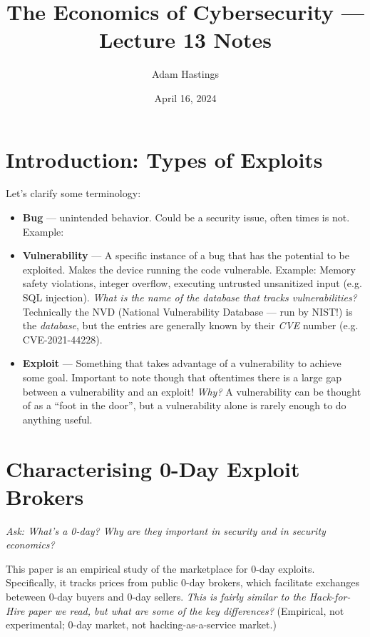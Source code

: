 \documentclass[11pt]{article}
\title{The Economics of Cybersecurity --- Lecture 13 Notes}
\date{April 16, 2024}
\author{Adam Hastings}
\begin{document}
\maketitle


\section{Introduction: Types of Exploits}

Let's clarify some terminology:

\begin{itemize}
    \item {\bf Bug} --- unintended behavior. Could be a security issue, often times is not. Example: 
    \item {\bf Vulnerability} --- A specific instance of a bug that has the potential to be exploited. Makes the device running the code vulnerable. Example: Memory safety violations, integer overflow, executing untrusted unsanitized input (e.g. SQL injection). {\it What is the name of the database that tracks vulnerabilities?} Technically the NVD (National Vulnerability Database --- run by NIST!) is the {\it database}, but the entries are generally known by their {\it CVE} number (e.g. CVE-2021-44228). 
    \item {\bf Exploit} --- Something that takes advantage of a vulnerability to achieve some goal. Important to note though that oftentimes there is a large gap between a vulnerability and an exploit! 
    {\it Why?} A vulnerability can be thought of as a ``foot in the door'', but a vulnerability alone is rarely enough to do anything useful.
\end{itemize}


\section{Characterising 0-Day Exploit Brokers}

{\it Ask: What's a 0-day? Why are they important in security and in security economics?}

This paper is an empirical study of the marketplace for 0-day exploits. Specifically, it tracks prices from public 0-day brokers, which facilitate exchanges beteween 0-day buyers and 0-day sellers. {\it This is fairly similar to the Hack-for-Hire paper we read, but what are some of the key differences?} (Empirical, not experimental; 0-day market, not hacking-as-a-service market.)
\end{document}
